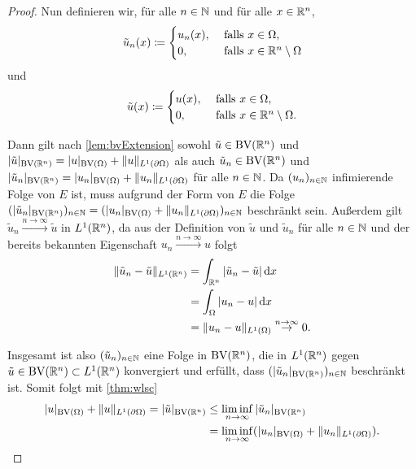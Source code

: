 \begin{proof}
  \medbreak
  Nun definieren wir, für alle
  $n\in\mathbb{N}$ und für alle 
  $x\in\mathbb{R}^n$,
  \begin{align*}
    \tilde{u}_n(x)\coloneqq
    \begin{cases}
      u_n(x),  &\text{ falls } x\in\Omega,\\
      0,     &\text{ falls } x\in\mathbb{R}^n\setminus\Omega
    \end{cases} 
  \end{align*}
  und
  \begin{align*}
    \tilde{u}(x)\coloneqq
    \begin{cases}
      u(x),  &\text{ falls } x\in\Omega,\\
      0,     &\text{ falls } x\in\mathbb{R}^n\setminus\Omega.
    \end{cases} 
  \end{align*}

  Dann gilt nach \cref{lem:bvExtension} sowohl $\tilde{u}\in\textup{BV}(\mathbb{R}^n)$ und
  $|\tilde{u}|_{\textup{BV}\left(\mathbb{R}^n\right)} = |u|_{\textup{BV}(\Omega)}+\Vert
  u\Vert_{L^1(\partial\Omega)}$ als auch $\tilde{u}_n\in\textup{BV}(\mathbb{R}^n)$
   und
   $|\tilde{u}_n|_{\textup{BV}\left(\mathbb{R}^n\right)}
  = |u_n|_{\textup{BV}(\Omega)}+\Vert u_n\Vert_{L^1(\partial\Omega)}$ für alle
  $n\in\mathbb{N}$.
  Da $(u_n)_{n\in \mathbb{N}}$ infimierende Folge von $E$ ist, muss aufgrund der
  Form von $E$ die Folge
  $(|\tilde{u}_n|_{\textup{BV}(\mathbb{R}^n)})_{n\in\mathbb{N}} = (|u_n|_{\textup{BV}(\Omega)}+\Vert
  u_n\Vert_{L^1(\partial\Omega)})_{n\in\mathbb{N}}$
  beschränkt sein.
  Außerdem gilt $\tilde{u}_n \overset{n\to\infty}{\to} \tilde{u}$ in
  $L^1(\mathbb{R}^n)$, da aus der Definition von $\tilde{u}$ und 
  $\tilde{u}_n$ für alle $n\in\mathbb{N}$ und der bereits bekannten Eigenschaft 
  $u_n\overset{n\to\infty}{\to} u$ folgt
  \begin{align*}
    \Vert \tilde{u}_n - \tilde{u}\Vert_{L^1(\mathbb{R}^n)} 
    &= \int_{\mathbb{R}^n} |\tilde{u}_n - \tilde{u}|\,\mathrm{d}x\\
    &= \int_\Omega |u_n - u|\,\mathrm{d}x\\
    &= \Vert u_n - u\Vert_{L^1(\Omega)} \overset{n\to\infty}{\to} 0.
  \end{align*}

  Insgesamt ist also $(\tilde{u}_n)_{n\in\mathbb{N}}$ eine Folge in $\textup{BV}(\mathbb{R}^n)$,
  die in $L^1(\mathbb{R}^n)$ gegen $\tilde{u}\in\textup{BV}(\mathbb{R}^n)\subset
  L^1(\mathbb{R}^n)$ konvergiert und 
  erfüllt, dass $(|\tilde{u}_n|_{\textup{BV}(\mathbb{R}^n)})_{n\in\mathbb{N}}$ beschränkt
  ist. Somit folgt mit
  \cref{thm:wlsc}  
  \begin{equation}
    \label{eq:wlscOfExtension}
    \begin{aligned}
      |u|_{\textup{BV}(\Omega)} +\Vert u\Vert_{L^1(\partial\Omega)}
      = |\tilde{u}|_{\textup{BV}(\mathbb{R}^n)}
      &\leq\liminf_{n\to\infty} |\tilde{u}_n|_{\textup{BV}(\mathbb{R}^n)}\\
      &= \liminf_{n\to\infty} (|u_n|_{\textup{BV}(\Omega)} +
      \Vert u_n\Vert_{L^1(\partial\Omega)}).
    \end{aligned}
  \end{equation}


\end{proof}

